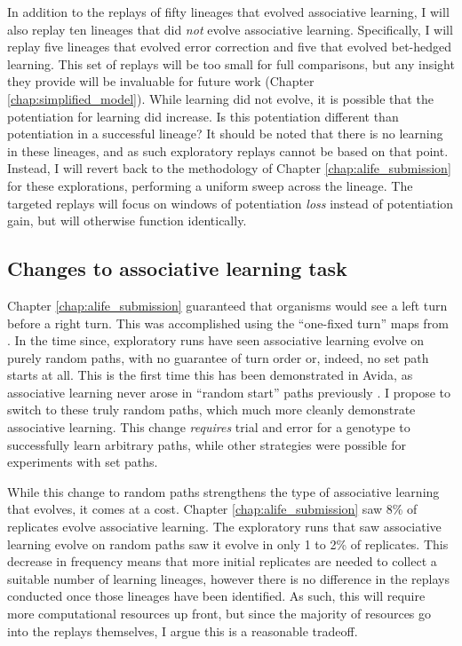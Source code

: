 In addition to the replays of fifty lineages that evolved associative learning, I will also replay ten lineages that did \textit{not} evolve associative learning. 
Specifically, I will replay five lineages that evolved error correction and five that evolved bet-hedged learning. 
This set of replays will be too small for full comparisons, but any insight they provide will be invaluable for future work (Chapter \ref{chap:simplified_model}). 
While learning did not evolve, it is possible that the potentiation for learning did increase. 
Is this potentiation different than potentiation in a successful lineage? 
It should be noted that there is no learning in these lineages, and as such exploratory replays cannot be based on that point. 
Instead, I will revert back to the methodology of Chapter \ref{chap:alife_submission} for these explorations, performing a uniform sweep across the lineage. 
The targeted replays will focus on windows of potentiation \textit{loss} instead of potentiation gain, but will otherwise function identically. 

\subsection{Changes to associative learning task}

Chapter \ref{chap:alife_submission} guaranteed that organisms would see a left turn before a right turn. 
This was accomplished using the ``one-fixed turn'' maps from \citep{pontesEvolutionaryOriginAssociative2020}. 
In the time since, exploratory runs have seen associative learning evolve on purely random paths, with no guarantee of turn order or, indeed, no set path starts at all. 
This is the first time this has been demonstrated in Avida, as associative learning never arose in ``random start'' paths previously \citep{pontesEvolutionaryOriginAssociative2020}. 
I propose to switch to these truly random paths, which much more cleanly demonstrate associative learning. 
This change \textit{requires} trial and error for a genotype to successfully learn arbitrary paths, while other strategies were possible for experiments with set paths. 

While this change to random paths strengthens the type of associative learning that evolves, it comes at a cost. 
Chapter \ref{chap:alife_submission} saw 8\% of replicates evolve associative learning. 
The exploratory runs that saw associative learning evolve on random paths saw it evolve in only 1 to 2\% of replicates. 
This decrease in frequency means that more initial replicates are needed to collect a suitable number of learning lineages, however there is no difference in the replays conducted once those lineages have been identified. 
As such, this will require more computational resources up front, but since the majority of resources go into the replays themselves, I argue this is a reasonable tradeoff. 

